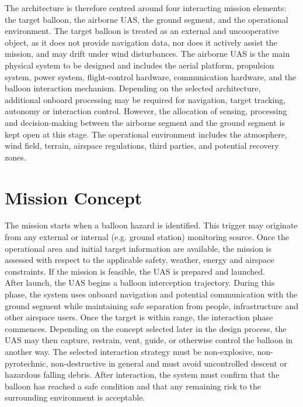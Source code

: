 The architecture is therefore centred around four interacting mission elements: the target balloon, the airborne UAS, the ground segment, and the operational environment. The target balloon is treated as an external and uncooperative object, as it does not provide navigation data, nor does it actively assist the mission, and may drift under wind disturbances. The airborne UAS is the main physical system to be designed and includes the aerial platform, propulsion system, power system, flight-control hardware, communication hardware, and the balloon interaction mechanism. Depending on the selected architecture, additional onboard processing may be required for navigation, target tracking, autonomy or interaction control. However, the allocation of sensing, processing and decision-making between the airborne segment and the ground segment is kept open at this stage. The operational environment includes the atmosphere, wind field, terrain, airspace regulations, third parties, and  potential recovery zones.\\

\section{Mission Concept}

The mission starts when a balloon hazard is identified. This trigger may originate from any external or internal (e.g. ground station) monitoring source. Once the operational area and initial target information are available, the mission is assessed with respect to the applicable safety, weather, energy and airspace constraints. If the mission is feasible, the UAS is prepared and launched.\\

After launch, the UAS begins a balloon interception trajectory. During this phase, the system uses onboard navigation and potential communication with the ground segment while maintaining safe separation from people, infrastructure and other airspace users. Once the target is within range, the interaction phase commences. Depending on the concept selected later in the design process, the UAS may then capture, restrain, vent, guide, or otherwise control the balloon in another way. The selected interaction strategy must be non-explosive, non-pyrotechnic, non-destructive in general and must avoid uncontrolled descent or hazardous falling debris. After interaction, the system must confirm that the balloon has reached a safe condition and that any remaining risk to the surrounding environment is acceptable.\\


